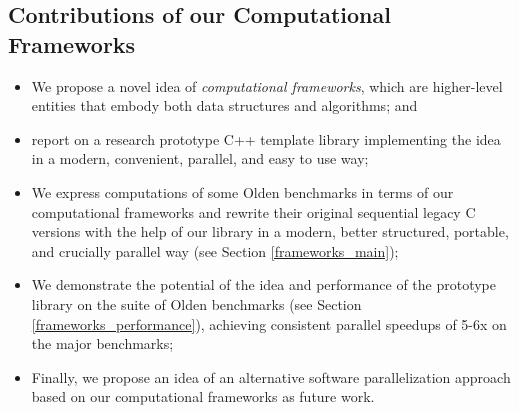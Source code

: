 \subsection{Contributions of our Computational Frameworks}
\begin{itemize}[style=unboxed,leftmargin=0cm]
\itemsep0em
\renewcommand\labelitemi{$\vartriangleright$}
\renewcommand\labelitemii{$\bullet$}
\item We propose a novel idea of \textit{computational frameworks}, which are higher-level entities that embody both data structures and algorithms; and
\item report on a research prototype C++ template library \cite{frameworks-repo} implementing the idea in a modern, convenient, parallel, and easy to use way;
\item We express computations of some Olden benchmarks in terms of our computational frameworks and rewrite their original sequential legacy C versions with the help of our library in a modern, better structured, portable, and crucially parallel way (see Section \ref{frameworks_main});
\item We demonstrate the potential of the idea and performance of the prototype library on the suite of Olden benchmarks (see Section \ref{frameworks_performance}), achieving consistent parallel speedups of 5-6x on the major benchmarks;
\item Finally, we propose an idea of an alternative software parallelization approach based on our computational frameworks as future work.
\end{itemize}

%